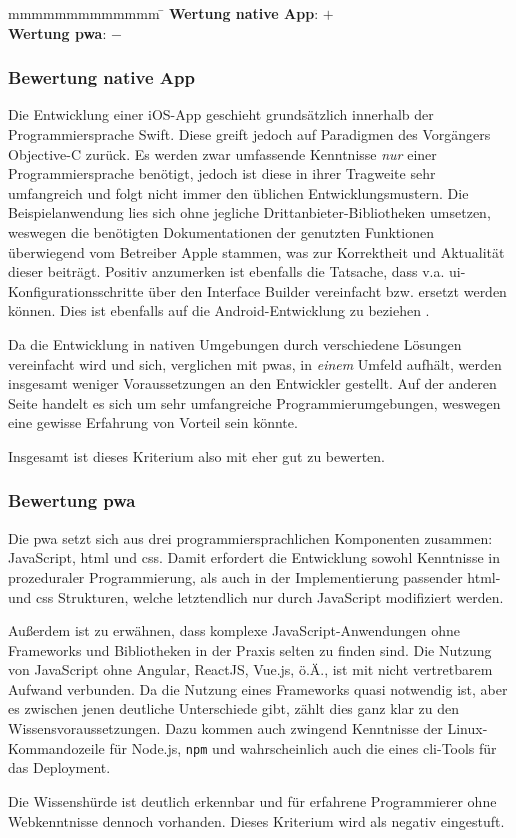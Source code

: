 \begin{tabbing}
	mmmmmmmmmmmmm				\= \kill
	\textbf{Wertung native App}: \> $+$ \\
	\textbf{Wertung \ac{pwa}}: \> $-$\\
\end{tabbing}

\subsubsection{Bewertung native App}
Die Entwicklung einer iOS-App geschieht grundsätzlich innerhalb der Programmiersprache Swift. Diese greift jedoch auf Paradigmen des Vorgängers Objective-C zurück. Es werden zwar umfassende Kenntnisse \textit{nur} einer Programmiersprache benötigt, jedoch ist diese in ihrer Tragweite sehr umfangreich und folgt nicht immer den üblichen Entwicklungsmustern. Die Beispielanwendung lies sich ohne jegliche Drittanbieter-Bibliotheken umsetzen, weswegen die benötigten Dokumentationen der genutzten Funktionen überwiegend vom Betreiber Apple stammen, was zur Korrektheit und Aktualität dieser beiträgt. Positiv anzumerken ist ebenfalls die Tatsache, dass v.a. \ac{ui}-Konfigurationsschritte über den Interface Builder vereinfacht bzw. ersetzt werden können. Dies ist ebenfalls auf die Android-Entwicklung zu beziehen \cite{AndroidStudio}.

Da die Entwicklung in nativen Umgebungen durch verschiedene Lösungen vereinfacht wird und sich, verglichen mit \acp{pwa}, in \textit{einem} Umfeld aufhält, werden insgesamt weniger Voraussetzungen an den Entwickler gestellt. Auf der anderen Seite handelt es sich um sehr umfangreiche Programmierumgebungen, weswegen eine gewisse Erfahrung von Vorteil sein könnte. 

Insgesamt ist dieses Kriterium also mit eher gut zu bewerten.

\subsubsection{Bewertung \ac{pwa}}
Die \ac{pwa} setzt sich aus drei programmiersprachlichen Komponenten zusammen: JavaScript, \ac{html} und \ac{css}. Damit erfordert die Entwicklung sowohl Kenntnisse in prozeduraler Programmierung, als auch in der Implementierung passender \ac{html}- und \ac{css} Strukturen, welche letztendlich nur durch JavaScript modifiziert werden.

Außerdem ist zu erwähnen, dass komplexe JavaScript-Anwendungen ohne Frameworks und Bibliotheken in der Praxis selten zu finden sind. Die Nutzung von JavaScript ohne Angular, ReactJS, Vue.js, ö.Ä., ist mit nicht vertretbarem Aufwand verbunden. Da die Nutzung eines Frameworks quasi notwendig ist, aber es zwischen jenen deutliche Unterschiede gibt, zählt dies ganz klar zu den Wissensvoraussetzungen. Dazu kommen auch zwingend Kenntnisse der Linux-Kommandozeile für Node.js, \texttt{npm} und wahrscheinlich auch die eines \ac{cli}-Tools für das Deployment.

Die Wissenshürde ist deutlich erkennbar und für erfahrene Programmierer ohne Webkenntnisse dennoch vorhanden. Dieses Kriterium wird als negativ eingestuft.  